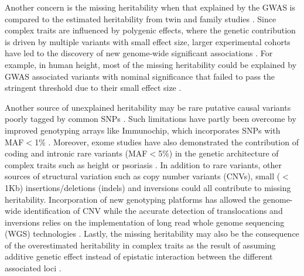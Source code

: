 Another concern is the missing heritability when that explained by the GWAS is compared to the estimated heritability from twin and family studies \parencite{Ku2010, Yang2010}. Since complex traits are influenced by polygenic effects, where the genetic contribution is driven by multiple variants with small effect size, larger experimental cohorts have led to the discovery of new genome-wide significant associations \parencite{Visscher2017}. For example, in human height, most of the missing heritability could be explained by GWAS associated variants with nominal significance that failed to pass the stringent threshold due to their small effect size \parencite{Yang2010}. 

Another source of unexplained heritability may be rare putative causal variants poorly tagged by common SNPs \parencite{Wray2005}. Such limitations have partly been overcome by improved genotyping arrays like Immunochip, which incorporates SNPs with MAF${<}$1\% \parencite{Cortes2011}. Moreover, exome studies have also demonstrated the contribution of coding and intronic rare variants (MAF${<}$5\%) in the genetic architecture of complex traits such as height or psoriasis \parencite{ Marouli2017, Dand2017}. In addition to rare variants, other sources of structural variation such as copy number variants (CNVs), small ($<$1Kb) insertions/deletions (indels) and inversions could all contribute to missing heritability. Incorporation of new genotyping platforms has allowed the genome-wide identification of CNV while the accurate detection of translocations and inversions relies on the implementation of long read whole genome sequencing (WGS) technologies \parencite{Glessner2009,Marshall2017,Visscher2017}. Lastly, the missing heritability may also be the consequence of the overestimated heritability in complex traits as the result of assuming additive genetic effect instead of epistatic interaction between the different associated loci \parencite{Zuk2012}. 




